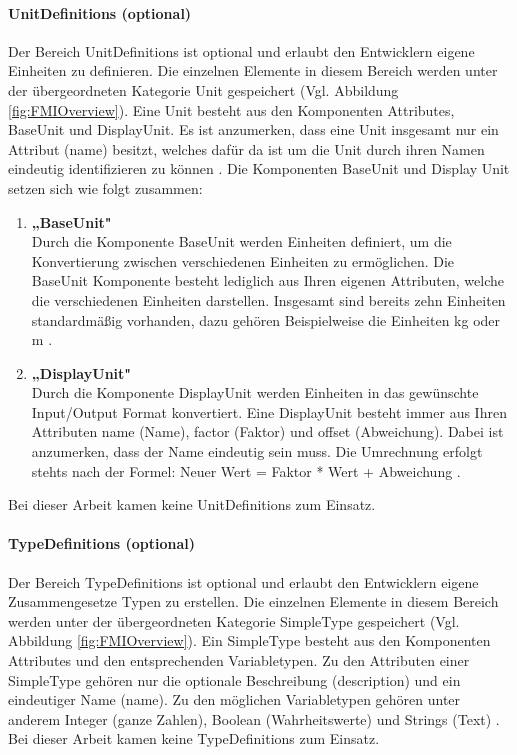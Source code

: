 \paragraph{UnitDefinitions (optional)}\label{sec:UnitDefinitions}
\noindent Der Bereich UnitDefinitions ist optional und erlaubt den Entwicklern eigene Einheiten zu definieren.  Die einzelnen Elemente in diesem Bereich werden unter der übergeordneten Kategorie Unit gespeichert (Vgl. Abbildung \ref{fig:FMIOverview}). Eine Unit besteht aus den Komponenten Attributes, BaseUnit und DisplayUnit. Es ist anzumerken, dass eine Unit insgesamt nur ein Attribut (name) besitzt, welches dafür da ist um die Unit durch ihren Namen eindeutig identifizieren zu können \cite[S.34]{25}. Die Komponenten BaseUnit und Display Unit setzen sich wie folgt zusammen:
\begin{enumerate}
	\item \textbf{„BaseUnit"} \cite[S.35]{25} \\
	Durch die Komponente BaseUnit werden Einheiten definiert, um die Konvertierung zwischen
	verschiedenen Einheiten zu ermöglichen. Die BaseUnit Komponente besteht lediglich aus 
	Ihren eigenen Attributen, welche die verschiedenen Einheiten darstellen. Insgesamt sind 
	bereits zehn Einheiten standardmäßig vorhanden, dazu gehören Beispielweise die Einheiten 
	kg oder m \cite[S.35]{25}.
	\item \textbf{„DisplayUnit"} \cite[S.38]{25} \\
	Durch die Komponente DisplayUnit werden Einheiten in das gewünschte Input/Output
	Format konvertiert. Eine DisplayUnit besteht immer aus Ihren Attributen name (Name), 
	factor (Faktor) und offset (Abweichung). Dabei ist anzumerken, dass der Name eindeutig sein 
	muss. Die Umrechnung erfolgt stehts nach der Formel: Neuer Wert = Faktor * Wert + 
	Abweichung \cite[S.38]{25}.
\end{enumerate}
Bei dieser Arbeit kamen keine UnitDefinitions zum Einsatz.

\paragraph{TypeDefinitions (optional)}\label{sec:TypeDefinitions}
\noindent Der Bereich TypeDefinitions ist optional und erlaubt den Entwicklern eigene Zusammengesetze Typen zu erstellen. Die einzelnen Elemente in diesem Bereich werden unter der übergeordneten Kategorie SimpleType gespeichert (Vgl. Abbildung \ref{fig:FMIOverview}). Ein SimpleType besteht aus den Komponenten Attributes und den entsprechenden Variabletypen. Zu den Attributen einer SimpleType gehören nur die optionale Beschreibung (description) und ein eindeutiger Name (name). Zu den möglichen Variabletypen gehören unter anderem Integer (ganze Zahlen), Boolean (Wahrheitswerte) und Strings (Text) \cite[S.39]{25}.
\newline
Bei dieser Arbeit kamen keine TypeDefinitions zum Einsatz.

